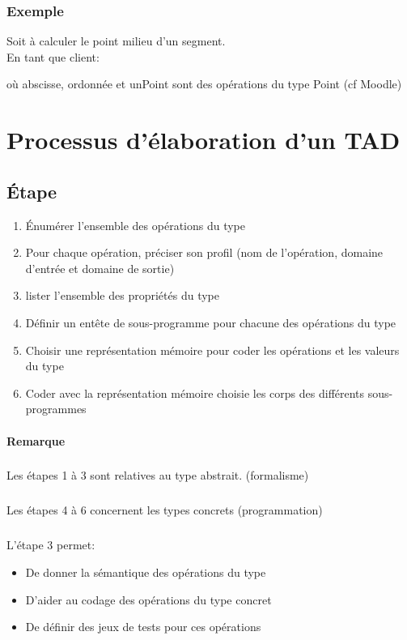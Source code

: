 			\subsubsection{Exemple}
				Soit à calculer le point milieu d'un segment. \\
				En tant que client:	
				
%				
				
				où abscisse, ordonnée et unPoint sont des opérations du type Point (cf Moodle)					
\section{Processus d'élaboration d'un TAD}
	\subsection{Étape}
		 \begin{enumerate}
			\item Énumérer l'ensemble des opérations du type
			\item Pour chaque opération, préciser son profil (nom de l'opération, domaine d'entrée et 
				domaine de sortie)
			\item lister l'ensemble des propriétés du type
			\item Définir un entête de sous-programme pour chacune des opérations du type
			\item Choisir une représentation mémoire pour coder les opérations et les valeurs du type
			\item Coder avec la représentation mémoire choisie les corps des différents sous-programmes
		\end{enumerate} 	
		\paragraph{Remarque}
			\subparagraph{} Les étapes 1 à 3 sont relatives au type abstrait. (formalisme)	
			\subparagraph{} Les étapes 4 à 6 concernent les types concrets (programmation)
			\subparagraph{} L'étape 3 permet:
				\begin{itemize} 
					\item De donner la sémantique des opérations du type
					\item D'aider au codage des opérations du type concret
					\item De définir des jeux de tests pour ces opérations
				\end{itemize}

